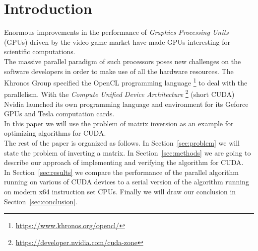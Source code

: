 


\section{Introduction}\label{sec:introduction}
Enormous improvements in the performance of \emph{Graphics Processing Units} (GPUs) driven by the video game market have made GPUs interesting for scientific computations. \\
The massive parallel paradigm of such processors poses new challenges on the software developers in order to make use of all the hardware resources. The Khronos Group specified the OpenCL programming language \footnote{\url{https://www.khronos.org/opencl/}} to deal with the parallelism. With the \emph{Compute Unified Device Architecture} \footnote{\url{https://developer.nvidia.com/cuda-zone}} (short CUDA) Nvidia launched its own programming language and environment for its Geforce GPUs and Tesla computation cards. \\
In this paper we will use the problem of matrix inversion as an example  for optimizing algorithms for CUDA.
\vspace{0.3cm}\\
The rest of the paper is organized as follows.  In Section~\ref{sec:problem} we will state the problem of inverting a matrix. In Section~\ref{sec:methods} we are going to describe our approach of implementing and verifying the algorithm for CUDA.\\
In Section~\ref{sec:results} we compare the performance of the parallel algorithm running on various of CUDA devices to a serial version of the algorithm running on modern x64 instruction set CPUs. Finally we will draw our conclusion in Section~\ref{sec:conclusion}.




